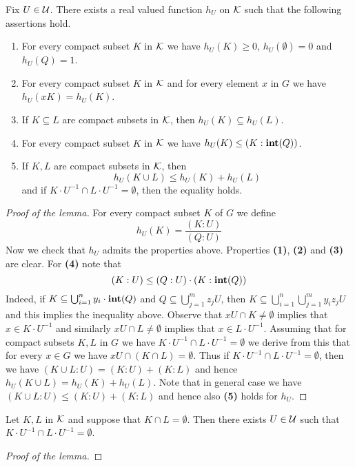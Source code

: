 \begin{lemma}\label{lemma:approximationoncompactsets}
Fix $U\in {\mathcal U}$. There exists a real valued function $h_U$ on ${\mathcal K}$ such that the following assertions hold.
\begin{enumerate}[label=\emph{\textbf{(\arabic*)}}, leftmargin=1.5em]
\item For every compact subset $K$ in ${\mathcal K}$ we have $h_U(K)\geq 0$, $h_U(\emptyset) = 0$ and $h_U(Q)=1$.
\item For every compact subset $K$ in ${\mathcal K}$ and for every element $x$ in $G$ we have $h_U(xK) = h_U(K)$.
\item If $K\subseteq L$ are compact subsets in ${\mathcal K}$, then $h_U(K)\subseteq h_U(L)$.
\item For every compact subset $K$ in ${\mathcal K}$ we have $h_U(K) \leq \left(K:\mathbf{int}(Q)\right)$.
\item If $K, L$ are compact subsets in ${\mathcal K}$, then
$$h_U(K\cup L) \leq h_U(K) + h_U(L)$$
and if $K\cdot U^{-1}\cap L\cdot U^{-1} = \emptyset$, then the equality holds.
\end{enumerate}
\end{lemma}
\begin{proof}[Proof of the lemma]
For every compact subset $K$ of $G$ we define
$$h_U(K) = \frac{(K:U)}{(Q:U)}$$
Now we check that $h_U$ admits the properties above. Properties \textbf{(1)}, \textbf{(2)} and \textbf{(3)} are clear. For \textbf{(4)} note that
$$(K:U) \leq (Q:U)\cdot\left(K:\mathbf{int}(Q)\right)$$
Indeed, if $K\subseteq \bigcup_{i=1}^ny_i\cdot \mathbf{int}(Q)$ and $Q\subseteq \bigcup_{j=1}^mz_jU$, then $K\subseteq \bigcup_{i=1}^n\bigcup_{j=1}^my_iz_jU$ and this implies the inequality above. Observe that $xU \cap K \neq \emptyset$ implies that $x\in K\cdot U^{-1}$ and similarly $xU\cap L\neq \emptyset$ implies that $x\in L\cdot U^{-1}$. Assuming that for compact subsets $K, L$ in $G$ we have $ K\cdot U^{-1}\cap L\cdot U^{-1} = \emptyset$ we derive from this that for every $x\in G$ we have $xU\cap \left(K\cap L\right) = \emptyset$. Thus if $K\cdot U^{-1}\cap L\cdot U^{-1} = \emptyset$, then we have $(K\cup L:U) = (K:U)+(K:L)$ and hence $h_U(K\cup L) = h_U(K)+h_U(L)$. Note that in general case we have $(K\cup L:U) \leq (K:U)+(K:L)$ and hence also \textbf{(5)} holds for $h_U$.
\end{proof}

\begin{lemma}\label{lemma:compactsetsareseparablebyopens}
Let $K, L$ in ${\mathcal K}$ and suppose that $K\cap L =\emptyset$. Then there exists $U\in {\mathcal U}$ such that $K\cdot U^{-1}\cap L\cdot U^{-1} = \emptyset$.
\end{lemma}
\begin{proof}[Proof of the lemma]
\end{proof}

